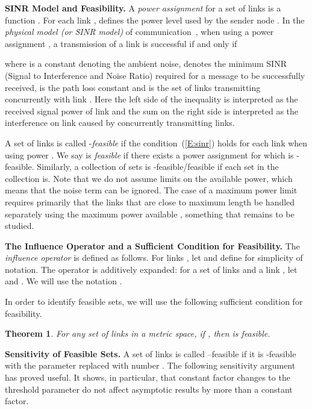 \documentclass[11pt]{article}
\newcommand{\mypara}[1]{\smallskip\noindent\textbf{#1.}}  \newcommand{\tightpara}[1]{\noindent\textbf{#1.}}
\newtheorem{theorem}{Theorem}
\begin{document}
\mypara{SINR Model and Feasibility}
A \emph{power assignment} for a set  of links is a function . For each link , \label{G:power} defines the power level used by the sender node . 
In the \emph{physical model (or SINR model)} of communication~\cite{rappaport}, when using a power assignment , a transmission of a link  is successful if and only if 

where \label{G:noise} is a constant denoting the ambient noise, \label{G:beta} denotes the minimum SINR (Signal to Interference and Noise Ratio) required for a message to be successfully received, \label{G:alpha} is the path loss constant and  is the set of links transmitting concurrently with link . Here the left side of the inequality is interpreted as the received signal power of link  and the sum on the right side is interpreted as the interference on link  caused by concurrently transmitting links.

A set  of links is called -\emph{feasible} if the condition~(\ref{E:sinr}) holds for each link  when using power . We say  is \emph{feasible} if there exists a power assignment  for which  is -feasible. Similarly, a collection of sets is -feasible/feasible if each set in the collection is.
Note that we do not assume limits on the available power, which means that the noise term can be ignored.
The case of a maximum power limit requires primarily that the links that are close to maximum length be handled separately using the maximum power available \cite{kesselheimflexible}, something that remains to be studied.


\mypara{The Influence Operator and a Sufficient Condition for Feasibility} 
The \emph{influence operator} \label{G:influence} is defined as follows. For links , let
 and define  for simplicity of notation.  The operator  is
additively expanded: for a set  of links and a link , let  and .  We will use the notation \label{G:il}.

In order to identify feasible sets, we will use the following sufficient condition for feasibility.
\begin{theorem}\cite{kesselheimconstantfactor}\label{T:kesselheimconstant}
For any set of links  in a metric space, if , then  is feasible.
\end{theorem}

\mypara{Sensitivity of Feasible Sets} A set of links is called --feasible if it is -feasible with the parameter  replaced with number . The following sensitivity argument has proved useful. It shows, in particular, that constant factor changes to the threshold parameter  do not affect asymptotic results by more than a constant factor.
\end{document}
